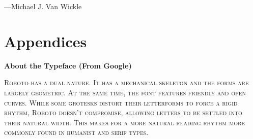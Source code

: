 \noindent\hspace*{2em} ---Michael J. Van Wickle
\vspace*{\fill}

\setlength{\parskip}{0em}

\tableofcontents
\newpage
\titleformat{\chapter}[frame]{\Large}{\filright\enspace\thechapter\enspace}{2.5cm}{\Large\bfseries\filcenter}
\setlength{\parskip}{0.25em}

\setcounter{section}{1}



\mainmatter
\renewcommand{\thefootnote}{\arabic{footnote}}











\part*{Appendices}
\appendix


\newpage
\backmatter

\titleformat{\chapter}[hang]{\Large}{\filright\enspace\thechapter\enspace}{2.5cm}{\Large\bfseries\filcenter}
\printbibliography

\newpage
{}
\vspace*{0.15\paperheight}
\begin{center}\bfseries
About the Typeface (From Google)
\end{center}
\noindent\hfil\parbox[c][1.1\height][c]{0.5\textwidth}{\small\scshape
Roboto has a dual nature.
It has a mechanical skeleton and the forms are largely geometric.
At the same time, the font features friendly and open curves.
While some grotesks distort their letterforms to force a rigid rhythm, Roboto doesn’t compromise, allowing letters to be settled into their natural width.
This makes for a more natural reading rhythm more commonly found in humanist and serif types.}
\vspace*{\fill}

